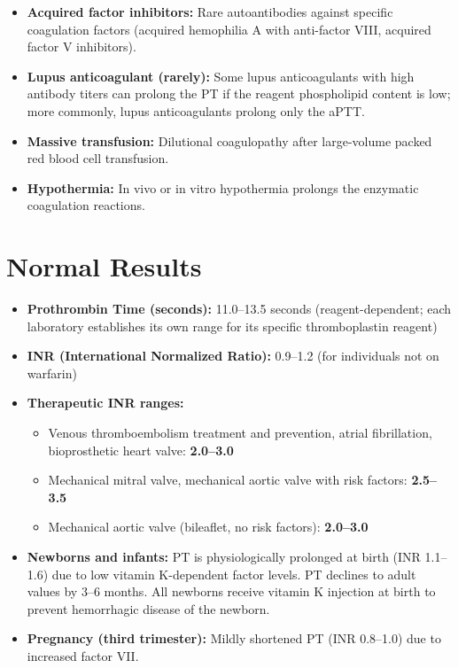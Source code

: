 \begin{itemize}
  \item \textbf{Acquired factor inhibitors:} Rare autoantibodies against specific coagulation factors (acquired hemophilia A with anti-factor VIII, acquired factor V inhibitors).
  \item \textbf{Lupus anticoagulant (rarely):} Some lupus anticoagulants with high antibody titers can prolong the PT if the reagent phospholipid content is low; more commonly, lupus anticoagulants prolong only the aPTT.
  \item \textbf{Massive transfusion:} Dilutional coagulopathy after large-volume packed red blood cell transfusion.
  \item \textbf{Hypothermia:} In vivo or in vitro hypothermia prolongs the enzymatic coagulation reactions.
\end{itemize}

\section*{Normal Results}
\begin{itemize}
  \item \textbf{Prothrombin Time (seconds):} 11.0--13.5 seconds (reagent-dependent; each laboratory establishes its own range for its specific thromboplastin reagent)
  \item \textbf{INR (International Normalized Ratio):} 0.9--1.2 (for individuals not on warfarin)
  \item \textbf{Therapeutic INR ranges:}
  \begin{itemize}
    \item Venous thromboembolism treatment and prevention, atrial fibrillation, bioprosthetic heart valve: \textbf{2.0--3.0}
    \item Mechanical mitral valve, mechanical aortic valve with risk factors: \textbf{2.5--3.5}
    \item Mechanical aortic valve (bileaflet, no risk factors): \textbf{2.0--3.0}
  \end{itemize}
  \item \textbf{Newborns and infants:} PT is physiologically prolonged at birth (INR 1.1--1.6) due to low vitamin K-dependent factor levels. PT declines to adult values by 3--6 months. All newborns receive vitamin K injection at birth to prevent hemorrhagic disease of the newborn.
  \item \textbf{Pregnancy (third trimester):} Mildly shortened PT (INR 0.8--1.0) due to increased factor VII.
\end{itemize}

